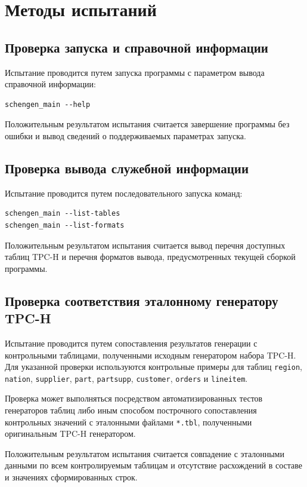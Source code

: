 \section{Методы испытаний}

\subsection{Проверка запуска и справочной информации}

Испытание проводится путем запуска программы с параметром вывода справочной
информации:
\begin{verbatim}
schengen_main --help
\end{verbatim}

Положительным результатом испытания считается завершение программы без ошибки и
вывод сведений о поддерживаемых параметрах запуска.

\subsection{Проверка вывода служебной информации}

Испытание проводится путем последовательного запуска команд:
\begin{verbatim}
schengen_main --list-tables
schengen_main --list-formats
\end{verbatim}

Положительным результатом испытания считается вывод перечня доступных таблиц
TPC-H и перечня форматов вывода, предусмотренных текущей сборкой программы.

\subsection{Проверка соответствия эталонному генератору TPC-H}

Испытание проводится путем сопоставления результатов генерации с контрольными
таблицами, полученными исходным генератором набора TPC-H. Для указанной
проверки используются контрольные примеры для таблиц \texttt{region},
\texttt{nation}, \texttt{supplier}, \texttt{part}, \texttt{partsupp},
\texttt{customer}, \texttt{orders} и \texttt{lineitem}.

Проверка может выполняться посредством автоматизированных тестов генераторов
таблиц либо иным способом построчного сопоставления контрольных значений с
эталонными файлами \texttt{*.tbl}, полученными оригинальным TPC-H генератором.

Положительным результатом испытания считается совпадение с эталонными данными
по всем контролируемым таблицам и отсутствие расхождений в составе и значениях
сформированных строк.

